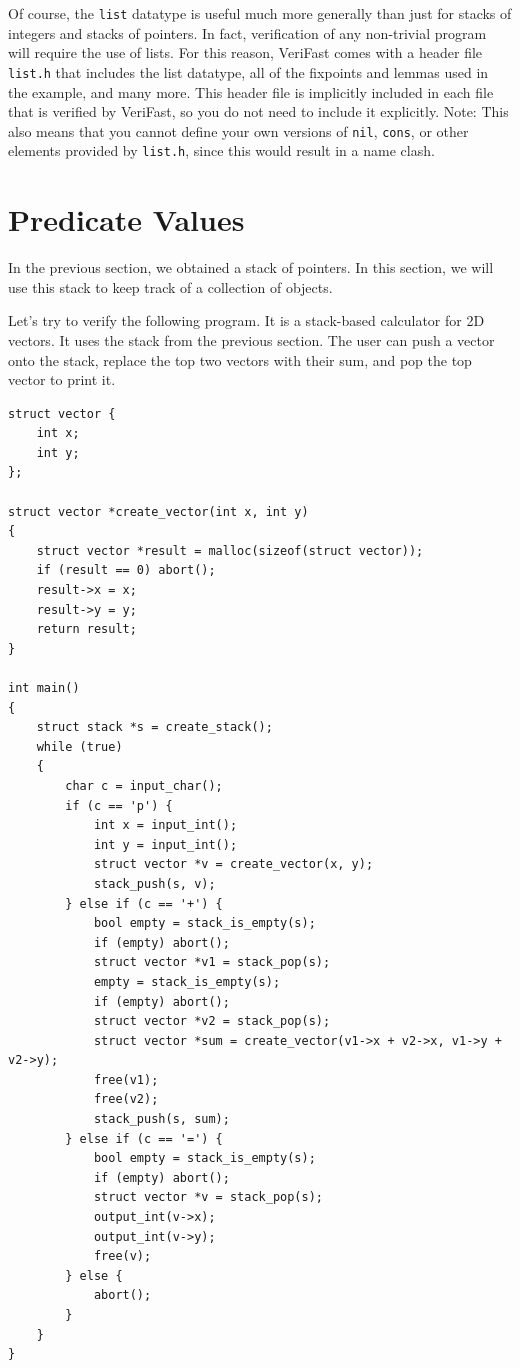 \documentclass{article}
\begin{document}
Of course, the \lstinline!list! datatype is useful much more
generally than just for stacks of integers and stacks of
pointers. In fact, verification of any non-trivial program will
require the use of lists. For this reason, VeriFast comes with
a header file \verb|list.h| that includes the list datatype,
all of the fixpoints and lemmas used in the example, and many
more. This header file is implicitly included in each file that
is verified by VeriFast, so you do not need to include it
explicitly. Note: This also means that you cannot define your
own versions of \lstinline!nil!, \lstinline!cons!, or other
elements provided by \verb|list.h|, since this would result in
a name clash.

\section{Predicate Values}

In the previous section, we obtained a stack of pointers. In
this section, we will use this stack to keep track of a
collection of objects.

Let's try to verify the following program. It is a stack-based
calculator for 2D vectors. It uses the stack from the previous
section. The user can push a vector onto the stack, replace the
top two vectors with their sum, and pop the top vector to print
it.

\begin{lstlisting}
struct vector {
    int x;
    int y;
};

struct vector *create_vector(int x, int y)
{
    struct vector *result = malloc(sizeof(struct vector));
    if (result == 0) abort();
    result->x = x;
    result->y = y;
    return result;
}

int main()
{
    struct stack *s = create_stack();
    while (true)
    {
        char c = input_char();
        if (c == 'p') {
            int x = input_int();
            int y = input_int();
            struct vector *v = create_vector(x, y);
            stack_push(s, v);
        } else if (c == '+') {
            bool empty = stack_is_empty(s);
            if (empty) abort();
            struct vector *v1 = stack_pop(s);
            empty = stack_is_empty(s);
            if (empty) abort();
            struct vector *v2 = stack_pop(s);
            struct vector *sum = create_vector(v1->x + v2->x, v1->y + v2->y);
            free(v1);
            free(v2);
            stack_push(s, sum);
        } else if (c == '=') {
            bool empty = stack_is_empty(s);
            if (empty) abort();
            struct vector *v = stack_pop(s);
            output_int(v->x);
            output_int(v->y);
            free(v);
        } else {
            abort();
        }
    }
}
\end{lstlisting}
\end{document}
